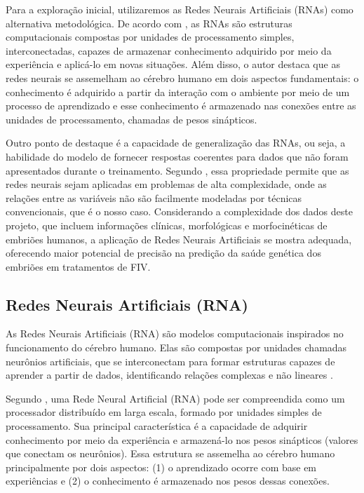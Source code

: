 Para a exploração inicial, utilizaremos as Redes Neurais Artificiais (RNAs) como alternativa metodológica. De acordo com , as RNAs são estruturas computacionais compostas por unidades de processamento simples, interconectadas, capazes de armazenar conhecimento adquirido por meio da experiência e aplicá-lo em novas situações. Além disso, o autor destaca que as redes neurais se assemelham ao cérebro humano em dois aspectos fundamentais: o conhecimento é adquirido a partir da interação com o ambiente por meio de um processo de aprendizado e esse conhecimento é armazenado nas conexões entre as unidades de processamento, chamadas de pesos sinápticos.

Outro ponto de destaque é a capacidade de generalização das RNAs, ou seja, a habilidade do modelo de fornecer respostas coerentes para dados que não foram apresentados durante o treinamento. Segundo , essa propriedade permite que as redes neurais sejam aplicadas em problemas de alta complexidade, onde as relações entre as variáveis não são facilmente modeladas por técnicas convencionais, que é o nosso caso. Considerando a complexidade dos dados deste projeto, que incluem informações clínicas, morfológicas e morfocinéticas de embriões humanos, a aplicação de Redes Neurais Artificiais se mostra adequada, oferecendo maior potencial de precisão na predição da saúde genética dos embriões em tratamentos de FIV.

\subsection{Redes Neurais Artificiais (RNA)}

As Redes Neurais Artificiais (RNA) são modelos computacionais inspirados no funcionamento do cérebro humano.  Elas são compostas por unidades chamadas neurônios artificiais, que se interconectam para formar estruturas capazes de aprender a partir de dados, identificando relações complexas e não lineares \cite{haykin2009}.

Segundo , uma Rede Neural Artificial (RNA) pode ser compreendida como um processador distribuído em larga escala, formado por unidades simples de processamento. Sua principal característica é a capacidade de adquirir conhecimento por meio da experiência e armazená-lo nos pesos sinápticos (valores que conectam os neurônios). Essa estrutura se assemelha ao cérebro humano principalmente por dois aspectos: (1) o aprendizado ocorre com base em experiências e (2) o conhecimento é armazenado nos pesos dessas conexões.

